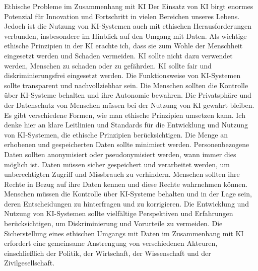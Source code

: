 \documentclass{article}
\begin{document}
Ethische Probleme im Zusammenhang mit KI
Der Einsatz von KI birgt enormes Potenzial für Innovation und Fortschritt in vielen Bereichen unseres Lebens. Jedoch ist die Nutzung von KI-Systemen auch mit ethischen Herausforderungen verbunden, insbesondere im Hinblick auf den Umgang mit Daten.
Als wichtige ethische Prinzipien in der KI erachte ich, dass sie zum Wohle der Menschheit eingesetzt werden und Schaden vermeiden.  KI sollte nicht dazu verwendet werden, Menschen zu schaden oder zu gefährden. KI sollte fair und diskriminierungsfrei eingesetzt werden. Die Funktionsweise von KI-Systemen sollte transparent und nachvollziehbar sein. Die Menschen sollten die Kontrolle über KI-Systeme behalten und ihre Autonomie bewahren. Die Privatsphäre und der Datenschutz von Menschen müssen bei der Nutzung von KI gewahrt bleiben.
Es gibt verschiedene Formen, wie man ethische Prinzipien umsetzen kann. Ich denke hier an klare Leitlinien und Standards für die Entwicklung und Nutzung von KI-Systemen, die ethische Prinzipien berücksichtigen. Die Menge an erhobenen und gespeicherten Daten sollte minimiert werden. Personenbezogene Daten sollten anonymisiert oder pseudonymisiert werden, wann immer dies möglich ist. Daten müssen sicher gespeichert und verarbeitet werden, um unberechtigten Zugriff und Missbrauch zu verhindern. Menschen sollten ihre Rechte in Bezug auf ihre Daten kennen und diese Rechte wahrnehmen können. Menschen müssen die Kontrolle über KI-Systeme behalten und in der Lage sein, deren Entscheidungen zu hinterfragen und zu korrigieren. Die Entwicklung und Nutzung von KI-Systemen sollte vielfältige Perspektiven und Erfahrungen berücksichtigen, um Diskriminierung und Vorurteile zu vermeiden.
Die Sicherstellung eines ethischen Umgangs mit Daten im Zusammenhang mit KI erfordert eine gemeinsame Anstrengung von verschiedenen Akteuren, einschließlich der Politik, der Wirtschaft, der Wissenschaft und der Zivilgesellschaft.

\clearpage
\end{document}
